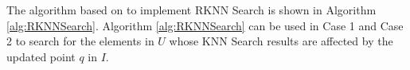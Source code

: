 The algorithm based on \dualtree to implement RKNN Search is shown in Algorithm \ref{alg:RKNNSearch}. Algorithm \ref{alg:RKNNSearch} can be used in Case 1 and Case 2 to search for the elements in $U$ whose KNN Search results are affected by the updated point $q$ in $I$. 

